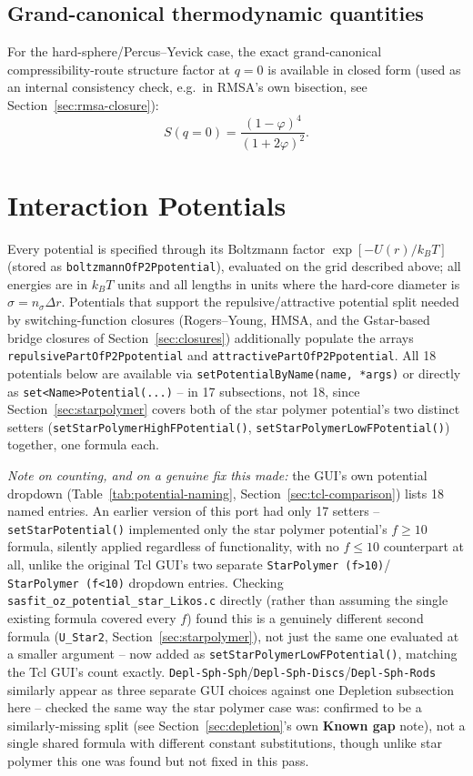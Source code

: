 \documentclass[11pt,a4paper]{article}
\newcommand{\code}[1]{\texttt{#1}}
\begin{document}
\subsection{Grand-canonical thermodynamic quantities}

For the hard-sphere/Percus--Yevick case, the exact grand-canonical
compressibility-route structure factor at $q=0$ is available in closed form
(used as an internal consistency check, e.g.\ in RMSA's own bisection, see
Section~\ref{sec:rmsa-closure}):
\begin{equation}
  S(q\!=\!0) = \frac{(1-\varphi)^4}{(1+2\varphi)^2}.
\end{equation}

\section{Interaction Potentials}
\label{sec:potentials}

Every potential is specified through its Boltzmann factor
$\exp[-U(r)/k_BT]$ (stored as \code{boltzmannOfP2Ppotential}), evaluated on the
grid described above; all energies are in $k_BT$ units and all lengths in units
where the hard-core diameter is $\sigma=n_\sigma\Delta r$. Potentials that
support the repulsive/attractive potential split needed by
switching-function closures (Rogers--Young, HMSA, and the Gstar-based bridge
closures of Section~\ref{sec:closures}) additionally populate the arrays
\code{repulsivePartOfP2Ppotential} and \code{attractivePartOfP2Ppotential}.
All 18
potentials below are available via \code{setPotentialByName(name, *args)} or
directly as \code{set<Name>Potential(...)} -- in 17 subsections, not 18,
since Section~\ref{sec:starpolymer} covers both of the star polymer
potential's two distinct setters (\code{setStarPolymerHighFPotential()},
\code{setStarPolymerLowFPotential()}) together, one formula each.

\emph{Note on counting, and on a genuine fix this made:} the GUI's own
potential dropdown (Table~\ref{tab:potential-naming},
Section~\ref{sec:tcl-comparison}) lists 18 named entries. An earlier version
of this port had only 17 setters -- \code{setStarPotential()} implemented
only the star polymer potential's $f\ge10$ formula, silently applied
regardless of functionality, with no $f\le10$ counterpart at all,
unlike the original Tcl GUI's two separate \code{StarPolymer (f>10)}/
\code{StarPolymer (f<10)} dropdown entries. Checking
\code{sasfit\_oz\_potential\_star\_Likos.c} directly (rather than assuming
the single existing formula covered every $f$) found this is a genuinely
different second formula (\code{U\_Star2}, Section~\ref{sec:starpolymer}),
not just the same one evaluated at a smaller argument -- now added as
\code{setStarPolymerLowFPotential()}, matching the Tcl GUI's count exactly.
\code{Depl-Sph-Sph}/\code{Depl-Sph-Discs}/\code{Depl-Sph-Rods} similarly
appear as three separate GUI choices against one Depletion subsection here
-- checked the same way the star polymer case was: confirmed to be a
similarly-missing split (see Section~\ref{sec:depletion}'s own
\textbf{Known gap} note), not a single shared formula with different
constant substitutions, though unlike star polymer this one was found but
not fixed in this pass.
\end{document}
